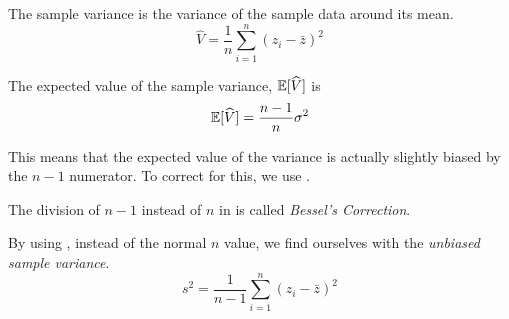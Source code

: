The sample variance is the variance of the sample data around its mean.
\begin{equation}\label{eq:Biased_Sample_Variance}
  \widehat{V} = \frac{1}{n} \sum\limits_{i=1}^{n} {(z_{i} - \bar{z})}^{2}
\end{equation}

The expected value of the sample variance, $\operatorname{\operatorname{\mathbb{E}}}[\widehat{V}]$ is
\begin{equation*}
  \operatorname{\operatorname{\mathbb{E}}}[\widehat{V}] = \frac{n-1}{n} \sigma^{2}
\end{equation*}

This means that the expected value of the variance is actually slightly biased by the $n-1$ numerator.
To correct for this, we use .
\begin{definition}\label{def:Bessels_Correction}
  The division of $n-1$ instead of $n$ in  is called \emph{Bessel's Correction}.
\end{definition}

\begin{definition}\label{def:Unbiased_Sample_Variance}
  By using , instead of the normal $n$ value, we find ourselves with the \emph{unbiased sample variance}.
  \begin{equation}\label{eq:Unbiased_Sample_Variance}
    s^{2} = \frac{1}{n-1} \sum\limits_{i=1}^{n} {(z_{i} - \bar{z})}^{2}
  \end{equation}
\end{definition}


